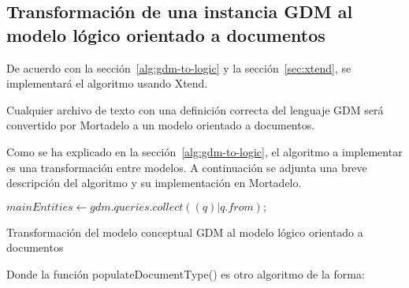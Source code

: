 \subsection{Transformación de una instancia GDM al modelo lógico orientado a documentos}
De acuerdo con la sección~\ref{alg:gdm-to-logic} y la sección~\ref{sec:xtend}, se implementará el algoritmo usando Xtend.

Cualquier archivo de texto con una definición correcta del lenguaje GDM será convertido por Mortadelo a un modelo orientado a documentos.


Como se ha explicado en la sección~\ref{alg:gdm-to-logic}, el algoritmo a implementar es una transformación entre modelos. A continuación se adjunta una breve descripción del algoritmo y su implementación en Mortadelo.

\begin{algorithm}[H]

    $mainEntities \gets gdm.queries.collect((q)|q.from);$\\
    
    \caption{Transformación del modelo conceptual GDM al modelo lógico orientado a documentos}
\end{algorithm}

Donde la función populateDocumentType() es otro algoritmo de la forma:

